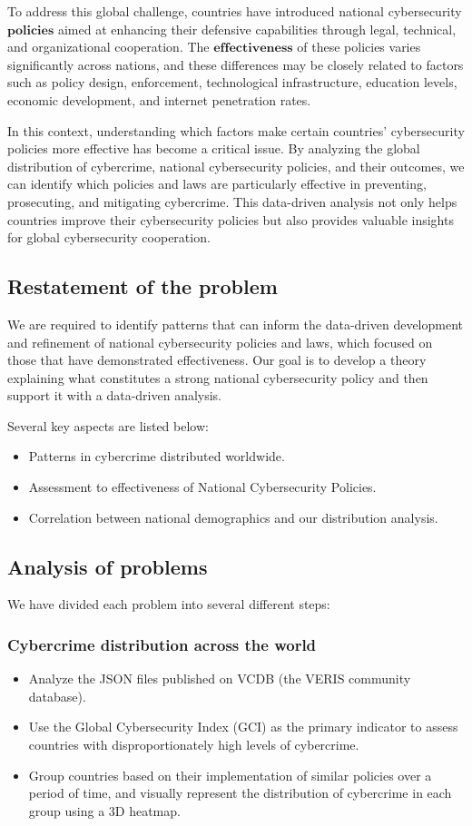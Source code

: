 \documentclass[12pt]{article}
\begin{document}
		To address this global challenge, countries have introduced national cybersecurity \( \textbf{policies} \)
		aimed at enhancing their defensive capabilities through legal, technical, and organizational cooperation.
		The \( \textbf{effectiveness} \) of these policies varies significantly across nations, and these differences may be closely related to factors
		such as policy design, enforcement, technological infrastructure, education levels, economic development, and internet penetration rates.

		In this context, understanding which factors make certain countries' cybersecurity policies more effective has become a critical issue.
		By analyzing the global distribution of cybercrime, national cybersecurity policies, and their outcomes,
		we can identify which policies and laws are particularly effective in preventing, prosecuting, and mitigating cybercrime.
		This data-driven analysis not only helps countries improve their cybersecurity policies
		but also provides valuable insights for global cybersecurity cooperation.
	\subsection{Restatement of the problem}\label{subsec:restatement-of-the-problem} %
		We are required to identify patterns that can inform the data-driven development and refinement of national cybersecurity policies and laws,
		which focused on those that have demonstrated effectiveness.
		Our goal is to develop a theory explaining what constitutes a strong national cybersecurity policy and then support it with a data-driven analysis.

		Several key aspects are listed below:
		\begin{itemize}
			\item Patterns in cybercrime distributed worldwide.
			\item Assessment to effectiveness of National Cybersecurity Policies.
			\item Correlation between national demographics and our distribution analysis.
		\end{itemize}
	\subsection{Analysis of problems}\label{subsec:analysis-of-problems} %
		We have divided each problem into several different steps:
		\subsubsection[]{Cybercrime distribution across the world} %
			\begin{itemize}
				\item Analyze the JSON files published on VCDB (the VERIS community database).
				\item Use the Global Cybersecurity Index (GCI) as the primary indicator to assess countries with disproportionately high levels of cybercrime.
				\item Group countries based on their implementation of similar policies over a period of time, and
					visually represent the distribution of cybercrime in each group using a 3D heatmap.
			\end{itemize}
\end{document}
